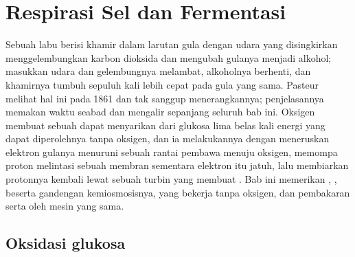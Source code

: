 \chapter{Respirasi Sel dan Fermentasi}\label{ch:b1:respiration-fermentation}

Sebuah labu berisi khamir dalam larutan gula dengan udara yang
disingkirkan menggelembungkan karbon dioksida dan mengubah gulanya
menjadi alkohol; masukkan udara dan gelembungnya melambat, alkoholnya
berhenti, dan khamirnya tumbuh sepuluh kali lebih cepat pada gula yang
sama. Pasteur melihat hal ini pada 1861 dan tak sanggup
menerangkannya; penjelasannya memakan waktu seabad dan mengalir
sepanjang seluruh bab ini. Oksigen membuat sebuah  dapat menyarikan
dari glukosa lima belas kali energi yang dapat diperolehnya tanpa
oksigen, dan ia melakukannya dengan meneruskan elektron gulanya
menuruni sebuah rantai pembawa menuju oksigen, memompa proton
melintasi sebuah membran sementara elektron itu jatuh, lalu
membiarkan protonnya kembali lewat sebuah turbin yang membuat . Bab
ini memerikan , ,  beserta
gandengan kemiosmosisnya,  yang bekerja tanpa oksigen, dan
pembakaran  serta  oleh mesin yang sama.

\section{Oksidasi glukosa}

